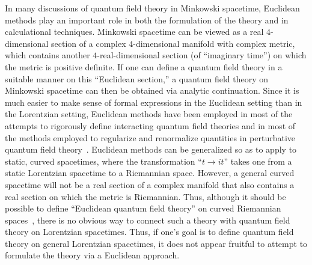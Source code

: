 \documentclass[12pt]{article}
\theoremstyle{plain}
\theoremstyle{definition}
\begin{document}
In many discussions of quantum field theory in Minkowski spacetime, Euclidean methods play an important role in both the formulation of the theory and in calculational techniques. Minkowski spacetime can be viewed as a real $4$-dimensional section of a complex $4$-dimensional manifold with complex metric, which contains another $4$-real-dimensional section (of ``imaginary time'') on which the metric is positive definite. If one can define a quantum field theory in a suitable manner on this ``Euclidean section,'' a quantum field theory on Minkowski spacetime can then be obtained via analytic continuation. Since it is much easier to make sense of formal expressions in the Euclidean setting than in the Lorentzian setting, Euclidean methods have been employed in most of the attempts to rigorously define interacting quantum field theories and in most of the methods employed to regularize and renormalize quantities in perturbative quantum field theory~\cite{glimm}. Euclidean methods can be generalized so as to apply to static, curved spacetimes, where the transformation ``$t \to it$'' takes one from a static Lorentzian spacetime to a Riemannian space. However, a general curved spacetime will not be a real section of a complex manifold that also contains a real section on which the metric is Riemannian. Thus, although it should be possible to define ``Euclidean quantum field theory'' on curved Riemannian spaces~\cite{komu}, there is no obvious way to connect such a theory with quantum field theory on Lorentzian spacetimes. Thus, if one's goal is to define quantum field theory on general Lorentzian spacetimes, it does not appear fruitful to attempt to formulate the theory via a Euclidean approach.
\end{document}
